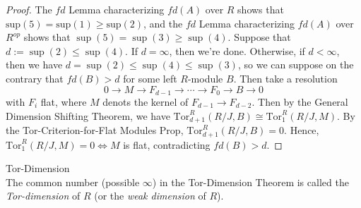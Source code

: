 \begin{proof}
    The $fd$ Lemma characterizing $fd(A)$ over $R$ shows that $\text{sup}(5)= \text{sup}(1)\geq \text{sup}(2)$, and the $fd$ Lemma characterizing $fd(A)$ over $R^{op}$ shows that $\sup(5)=\sup(3) \geq \sup(4)$. Suppose that $d:= \sup(2) \leq \sup(4)$. If $d=\infty$, then we're done. Otherwise, if $d<\infty$, then we have $d= \sup(2) \leq \sup(4)\leq \sup(3)$, so we can suppose on the contrary that $fd(B)>d$ for some left $R$-module $B$. Then take a resolution
    \[
    0\to M\to F_{d-1} \to \cdots \to F_0\to B\to 0
    \]
    with $F_i$ flat, where $M$ denots the kernel of $F_{d-1}\to F_{d-2}$. Then by the General Dimension Shifting Theorem, we have $\text{Tor}_{d+1}^R (R/J,B) \cong \text{Tor}_1^R (R/J,M)$. By the Tor-Criterion-for-Flat Modules Prop, $\text{Tor}_{d+1} ^R(R/J,B)=0$. Hence, $\text{Tor}_1^R (R/J,M)=0 \Leftrightarrow M$ is flat, contradicting $fd(B)>d$.
\end{proof}

\begin{definition}{Tor-Dimension}\\
The common number (possible $\infty$) in the Tor-Dimension Theorem is called the \textit{Tor-dimension} of $R$ (or the \textit{weak dimension} of $R$).
\end{definition}

